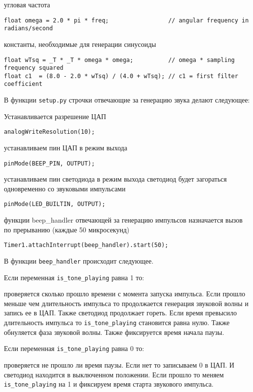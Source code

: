 \documentclass[../main.tex]{subfiles}
\begin{document}
угловая частота
\begin{lstlisting}
float omega = 2.0 * pi * freq;                 // angular frequency in radians/second
\end{lstlisting}

константы, необходимые для генерации синусоиды
\begin{lstlisting}
float wTsq = _T * _T * omega * omega;          // omega * sampling frequency squared
float c1  = (8.0 - 2.0 * wTsq) / (4.0 + wTsq); // c1 = first filter coefficient
\end{lstlisting}


В функции \texttt{setup.py} строчки отвечающие за генерацию звука делают следующее:

Устанавливается разрешение ЦАП
\begin{lstlisting}
analogWriteResolution(10);
\end{lstlisting}

устанавливаем пин ЦАП в режим выхода
\begin{lstlisting}
pinMode(BEEP_PIN, OUTPUT);
\end{lstlisting}

устанавливаем пин светодиода в режим выхода 
светодиод будет загораться одновременно со звуковыми импульсами
\begin{lstlisting}
pinMode(LED_BUILTIN, OUTPUT);
\end{lstlisting}

функции beep\_handler отвечающей за генерацию импульсов
назначается вызов по прерыванию (каждые 50 микросекунд)
\begin{lstlisting}
Timer1.attachInterrupt(beep_handler).start(50);
\end{lstlisting}


В функции \texttt{beep\_handler} происходит следующее.

Если переменная \texttt{is\_tone\_playing} равна 1 то:

проверяется сколько прошло времени с момента запуска импульса. Если прошло меньше чем длительность импульса то продолжается генерация звуковой волны и запись ее в ЦАП. Также светодиод продолжает гореть. Если время превысило длительность импульса то \texttt{is\_tone\_playing} становится равна нулю. Также обнуляется фаза звуковой волны. Также фиксируется время начала паузы.

Если переменная \texttt{is\_tone\_playing} равна 0 то:

проверяется не прошло ли время паузы. Если нет то записываем 0 в ЦАП. И светодиод находится в выключенном положении. Если прошло то меняем \texttt{is\_tone\_playing} на 1 и фиксируем время старта звукового импульса.
\end{document}
